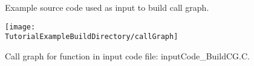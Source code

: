 \begin{figure}[!h]
{\indent
{\mySmallFontSize

\label{Tutorial:exampleInputCode_BuildCG}

\begin{latexonly}
   
\end{latexonly}

\begin{htmlonly}
   
\end{htmlonly}

}
}
\caption{Example source code used as input to build call graph.}
\end{figure}


\begin{figure}
\texttt{[image: \\TutorialExampleBuildDirectory/callGraph]}
\caption{Call graph for function in input code file: inputCode\_BuildCG.C.}
\label{Tutorial:exampleBuildCGGraph}
\end{figure}




